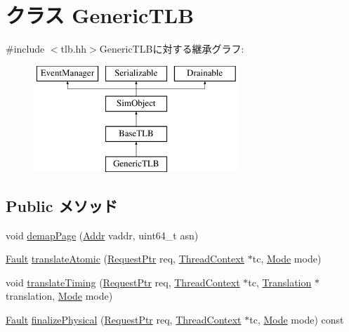\hypertarget{classGenericTLB}{
\section{クラス GenericTLB}
\label{classGenericTLB}
}


{\ttfamily \#include $<$tlb.hh$>$}GenericTLBに対する継承グラフ:\begin{figure}[H]
\begin{center}
\leavevmode
\includegraphics[height=4cm]{classGenericTLB}
\end{center}
\end{figure}
\subsection*{Public メソッド}
\begin{DoxyCompactItemize}
\item 
void \hyperlink{classGenericTLB_a2d698ff909513b48a1263f8a5440e067}{demapPage} (\hyperlink{base_2types_8hh_af1bb03d6a4ee096394a6749f0a169232}{Addr} vaddr, uint64\_\-t asn)
\item 
\hyperlink{classRefCountingPtr}{Fault} \hyperlink{classGenericTLB_ad54e01e3c0a1613098a76b7f92e5be93}{translateAtomic} (\hyperlink{classRequest}{RequestPtr} req, \hyperlink{classThreadContext}{ThreadContext} $\ast$tc, \hyperlink{classBaseTLB_a46c8a310cf4c094f8c80e1cb8dc1f911}{Mode} mode)
\item 
void \hyperlink{classGenericTLB_ae52f7e465748883695d2b4f432a13652}{translateTiming} (\hyperlink{classRequest}{RequestPtr} req, \hyperlink{classThreadContext}{ThreadContext} $\ast$tc, \hyperlink{classBaseTLB_1_1Translation}{Translation} $\ast$translation, \hyperlink{classBaseTLB_a46c8a310cf4c094f8c80e1cb8dc1f911}{Mode} mode)
\item 
\hyperlink{classRefCountingPtr}{Fault} \hyperlink{classGenericTLB_ae199d95c42e036851a8a0543c6d6d2e3}{finalizePhysical} (\hyperlink{classRequest}{RequestPtr} req, \hyperlink{classThreadContext}{ThreadContext} $\ast$tc, \hyperlink{classBaseTLB_a46c8a310cf4c094f8c80e1cb8dc1f911}{Mode} mode) const 
\end{DoxyCompactItemize}

